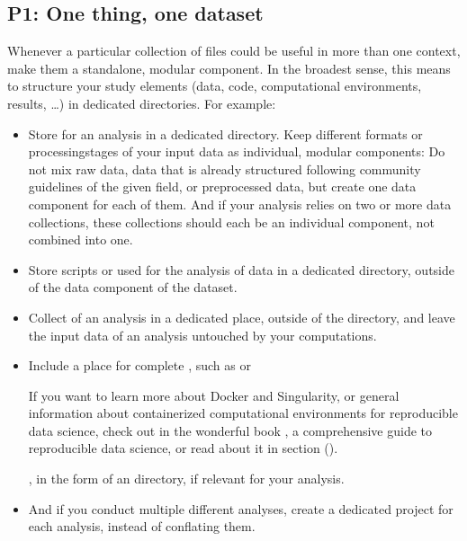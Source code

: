 \subsection{P1: One thing, one dataset}
\label{\detokenize{basics/101-127-yoda:p1-one-thing-one-dataset}}\label{\detokenize{basics/101-127-yoda:p1}}
\sphinxAtStartPar
Whenever a particular collection of files could be useful in more
than one context, make them a standalone, modular component.
In the broadest sense, this means to structure your study elements (data, code,
computational environments, results, …) in dedicated directories. For example:
\begin{itemize}
\item {} 
\sphinxAtStartPar
Store  for an analysis in a dedicated  directory.
Keep different formats or processing\sphinxhyphen{}stages of your input data as individual,
modular components:  Do not mix raw data, data that is already structured
following community guidelines of the given field, or preprocessed data, but create
one data component for each of them. And if your analysis
relies on two or more data collections, these collections should each be an
individual component, not combined into one.

\item {} 
\sphinxAtStartPar
Store scripts or  used for the analysis of data in a dedicated 
directory, outside of the data component of the dataset.

\item {} 
\sphinxAtStartPar
Collect  of an analysis in a dedicated place, outside of the  directory, and
leave the input data of an analysis untouched by your computations.

\item {} 
\sphinxAtStartPar
Include a place for complete , such as
 or
%
\begin{footnote}\sphinxAtStartFootnote
If you want to learn more about Docker and Singularity, or general information
about containerized computational environments for reproducible data science,
check out 
in the wonderful book ,
a comprehensive guide to reproducible data science, or read about it in
section {\hyperref[\detokenize{basics/101-133-containersrun:containersrun}]{}} ().
%
\end{footnote}, in
the form of an  directory, if relevant for your analysis.

\item {} 
\sphinxAtStartPar
And if you conduct multiple different analyses, create a dedicated
project for each analysis, instead of conflating them.

\end{itemize}

